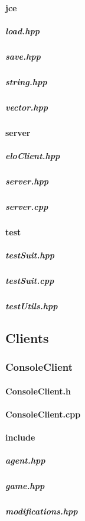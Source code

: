 \documentclass[12pt]{article}
\newcommand{\incFile}[2]{\label{code:#2}\newpage}
\begin{document}
\paragraph{jce}																%
\subparagraph{load.hpp}												\incFile{C++}{AlphaZeroPytorch/include/jce/load.hpp}
\subparagraph{save.hpp}												\incFile{C++}{AlphaZeroPytorch/include/jce/save.hpp}
\subparagraph{string.hpp}												\incFile{C++}{AlphaZeroPytorch/include/jce/string.hpp}
\subparagraph{vector.hpp}											\incFile{C++}{AlphaZeroPytorch/include/jce/vector.hpp}
\paragraph{server}															%
\subparagraph{eloClient.hpp}										\incFile{C++}{AlphaZeroPytorch/include/Server/eloClient.hpp}
\subparagraph{server.hpp}												\incFile{C++}{AlphaZeroPytorch/include/Server/server.hpp}
\subparagraph{server.cpp}												\incFile{C++}{AlphaZeroPytorch/include/Server/server.cpp}
\paragraph{test}																%
\subparagraph{testSuit.hpp}											\incFile{C++}{AlphaZeroPytorch/include/test/testSuit.hpp}	
\subparagraph{testSuit.cpp}											\incFile{C++}{AlphaZeroPytorch/include/test/testSuit.cpp}
\subparagraph{testUtils.hpp}											\incFile{C++}{AlphaZeroPytorch/include/test/testUtils.hpp}

\subsection{Clients}														%
\subsubsection{ConsoleClient}
\paragraph{ConsoleClient.h}											\incFile{C++}{Clients/ConsoleClient/ConsoleClient.h}
\paragraph{ConsoleClient.cpp}										\incFile{C++}{Clients/ConsoleClient/ConsoleClient.cpp}
\paragraph{include}														%
\subparagraph{agent.hpp}												\incFile{C++}{Clients/ConsoleClient/include/agent.hpp}
\subparagraph{game.hpp}												\incFile{C++}{Clients/ConsoleClient/include/game.hpp}
\subparagraph{modifications.hpp}								\incFile{C++}{Clients/ConsoleClient/include/modifications.hpp}
\end{document}
